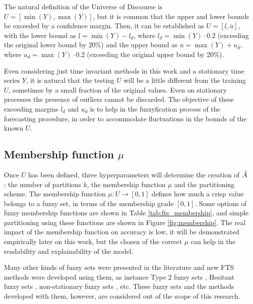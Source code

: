 The natural definition of the Universe of Discourse is $U = [\min(Y),\max(Y)]$, but it is common that the upper and lower bounds be exceeded by a confidence margin. Then, it can be established as $U = [\underline{l}, \overline{u}]$, with the lower bound as $\underline{l} = \min(Y) - l_d$, where $l_d = \min(Y)\cdot 0.2$ (exceeding the original lower bound by 20\%) and the upper bound as $\overline{u} = \max(Y) + u_d$, where $u_d = \max(Y)\cdot 0.2$ (exceeding the original upper bound by 20\%). 

Even considering just time invariant methods in this work and a stationary time series $Y$, it is natural that the testing $U$ will be a little different from the training $U$, sometimes by a small fraction of the original values. Even on stationary processes the presence of outliers cannot be discarded. The objective of these exceeding margins $l_d$ and $u_d$ is to help in the fuzzyfication process of the forecasting procedure, in order to accommodate fluctuations in the bounds of the known $U$.

%
\subsection{Membership function $\mu$}\index{$\mu$}
\label{sec:fts_membership}

Once $U$ has been defined, three hyperparameters will determine the creation of $\tilde{A}$: the number of partitions $k$, the membership function $\mu$ and the partitioning scheme. The membership function $\mu: U \rightarrow [0,1]$ defines how much a crisp value belongs to a fuzzy set, in terms of the membership grade $[0,1]$. Some options of fuzzy membership functions are shown in Table \ref{tab:fts_membership}, and simple partitioning using these functions are shown in Figure \ref{fig:membership}. The real impact of the membership function on accuracy is low, it will be demonstrated empirically later on this work, but the chosen of the correct $\mu$ can help in the readability and explainability of the model.

Many other kinds of fuzzy sets were presented in the literature and new FTS methods were developed using them, as instance Type 2 fuzzy sets \citep{huarng2005type, Bajestani2011}, Hesitant fuzzy sets \citep{Bisht2016}, non-stationary fuzzy sets \citep{Alves2018}, etc. These fuzzy sets and the methods developed with them, however, are considered out of the scope of this research.

